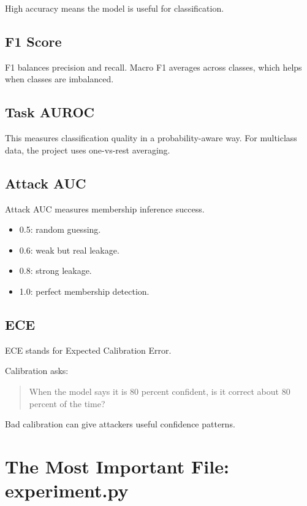 \documentclass[11pt,a4paper]{article}
\begin{document}
High accuracy means the model is useful for classification.

\subsection{F1 Score}

F1 balances precision and recall. Macro F1 averages across classes, which helps when classes are imbalanced.

\subsection{Task AUROC}

This measures classification quality in a probability-aware way. For multiclass data, the project uses one-vs-rest averaging.

\subsection{Attack AUC}

Attack AUC measures membership inference success.

\begin{itemize}
  \item 0.5: random guessing.
  \item 0.6: weak but real leakage.
  \item 0.8: strong leakage.
  \item 1.0: perfect membership detection.
\end{itemize}

\subsection{ECE}

ECE stands for Expected Calibration Error.

Calibration asks:

\begin{quote}
When the model says it is 80 percent confident, is it correct about 80 percent of the time?
\end{quote}

Bad calibration can give attackers useful confidence patterns.

\section{The Most Important File: experiment.py}
\end{document}
